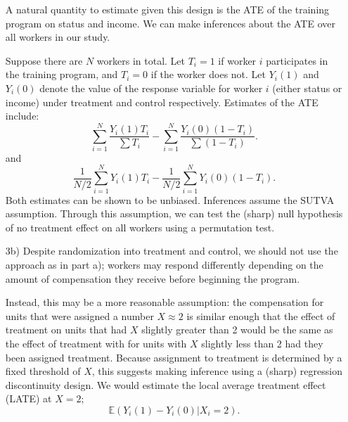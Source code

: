 \documentclass[11pt]{report}
\newcommand{\E}[0]{\mathbb{E}}
\begin{document}
\begin{itemize}
	A natural quantity to estimate given this design is the ATE of
	the training program on status and income.  
	We can make inferences about the ATE over all workers
	in our study.
	
	Suppose there are $N$ workers in total.
	Let $T_i = 1$ if worker $i$ participates in the 
	training program, and $T_i = 0$ if the worker does not.
	Let $Y_i(1)$ and $Y_i(0)$ denote the 
	value of the response variable for worker $i$
	(either status or income) under treatment
	and control respectively.
	Estimates of the ATE include:
	\begin{equation}
		\sum_{i = 1}^N \frac{Y_i(1)T_i}{\sum T_i} - \sum_{i = 1}^N \frac{Y_i(0)(1-T_i)}{\sum(1-T_i)}.
	\end{equation}
	and
	\begin{equation}
		\frac 1 {N/2}  \sum_{i = 1}^N Y_i(1)T_i - \frac 1 {N/2} \sum_{i = 1}^N Y_i(0)(1-T_i).
	\end{equation}
	Both estimates can be shown to be unbiased.
	Inferences assume the SUTVA assumption.
	Through this assumption,
	we can test the (sharp) null hypothesis of no treatment effect
	on all workers using a permutation test.
\item[3b)]	
	Despite randomization into treatment and control, 
	we should not use the approach as in part a);
	workers may respond differently depending on the
	amount of compensation they receive before beginning the program.
	
	Instead, this may be a more reasonable assumption: 
	the compensation for units that were assigned a number $X \approx 2$
	is similar enough that the effect of treatment on units that had $X$ slightly
	greater than 2 would be the same as the effect of treatment with 
	for units with $X$ slightly less than 2 had they been assigned treatment.
	Because assignment to treatment is determined by a fixed threshold of $X$, 
	this suggests making inference using a (sharp) regression discontinuity design.
	We would estimate the local average treatment effect (LATE) at $X = 2$;
	$$
		\E(Y_i(1) - Y_i(0) | X_i = 2).
	$$


\end{itemize}
\end{document}

